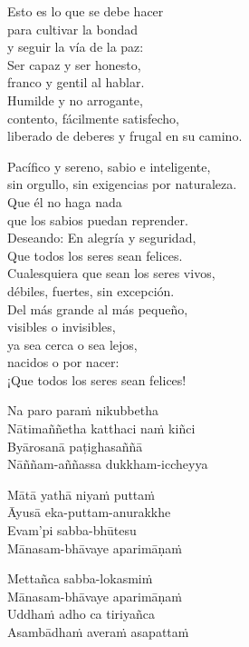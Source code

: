 
\begin{leader}
\end{leader}

Esto es lo que se debe hacer\\
para cultivar la bondad\\
y seguir la vía de la paz:\\
Ser capaz y ser honesto,\\
franco y gentil al hablar.\\
Humilde y no arrogante,\\
contento, fácilmente satisfecho,\\
liberado de deberes y frugal en su camino.

Pacífico y sereno, sabio e inteligente,\\
sin orgullo, sin exigencias por naturaleza.\\
Que él no haga nada\\
que los sabios puedan reprender.\\
Deseando: En alegría y seguridad,\\
Que todos los seres sean felices.\\
Cualesquiera que sean los seres vivos,\\
débiles, fuertes, sin excepción.\\
Del más grande al más pequeño,\\
visibles o invisibles,\\
ya sea cerca o sea lejos,\\
nacidos o por nacer: \\
¡Que todos los seres sean felices!

\clearpage

Na paro paraṁ nikubbetha\\
Nātimaññetha katthaci naṁ kiñci\\
Byārosanā paṭighasaññā\\
Nāññam-aññassa dukkham-iccheyya

Mātā yathā niyaṁ puttaṁ\\
Āyusā eka-puttam-anurakkhe\\
Evam'pi sabba-bhūtesu\\
Mānasam-bhāvaye aparimāṇaṁ

Mettañca sabba-lokasmiṁ\\
Mānasam-bhāvaye aparimāṇaṁ\\
Uddhaṁ adho ca tiriyañca\\
Asambādhaṁ averaṁ asapattaṁ

